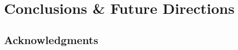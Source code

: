 \documentclass[\docopts]{\docclass}
\begin{document}

%



\section{Conclusions \& Future Directions}
\label{sec:conclusions}

%
%



\subsection*{Acknowledgments}








\end{document}
